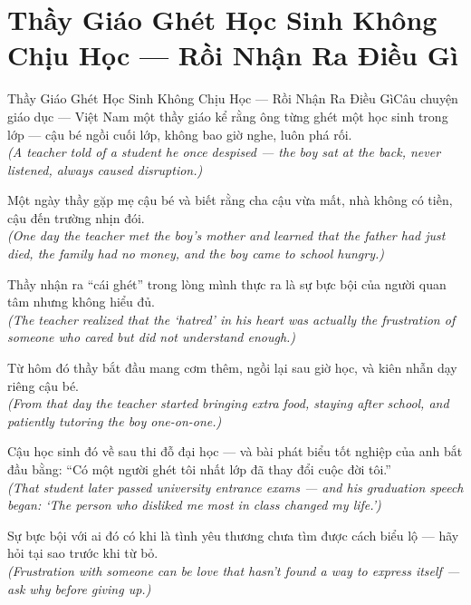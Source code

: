 \section{Thầy Giáo Ghét Học Sinh Không Chịu Học --- Rồi Nhận Ra Điều Gì}
\begin{truyen}{Thầy Giáo Ghét Học Sinh Không Chịu Học --- Rồi Nhận Ra Điều Gì}{Câu chuyện giáo dục --- Việt Nam}
 một thầy giáo kể rằng ông từng ghét một học sinh trong lớp --- cậu bé ngồi cuối lớp, không bao giờ nghe, luôn phá rối.\\[4pt]
\textit{(A teacher told of a student he once despised --- the boy sat at the back, never listened, always caused disruption.)}

Một ngày thầy gặp mẹ cậu bé và biết rằng cha cậu vừa mất, nhà không có tiền, cậu đến trường nhịn đói.\\[4pt]
\textit{(One day the teacher met the boy's mother and learned that the father had just died, the family had no money, and the boy came to school hungry.)}

Thầy nhận ra ``cái ghét'' trong lòng mình thực ra là sự bực bội của người quan tâm nhưng không hiểu đủ.\\[4pt]
\textit{(The teacher realized that the `hatred' in his heart was actually the frustration of someone who cared but did not understand enough.)}

Từ hôm đó thầy bắt đầu mang cơm thêm, ngồi lại sau giờ học, và kiên nhẫn dạy riêng cậu bé.\\[4pt]
\textit{(From that day the teacher started bringing extra food, staying after school, and patiently tutoring the boy one-on-one.)}

Cậu học sinh đó về sau thi đỗ đại học --- và bài phát biểu tốt nghiệp của anh bắt đầu bằng: ``Có một người ghét tôi nhất lớp đã thay đổi cuộc đời tôi.''\\[4pt]
\textit{(That student later passed university entrance exams --- and his graduation speech began: `The person who disliked me most in class changed my life.')}

\end{truyen}
\begin{baihoc}
  Sự bực bội với ai đó có khi là tình yêu thương chưa tìm được cách biểu lộ --- hãy hỏi tại sao trước khi từ bỏ.\\[4pt]
  \textit{(Frustration with someone can be love that hasn't found a way to express itself --- ask why before giving up.)}
\end{baihoc}
